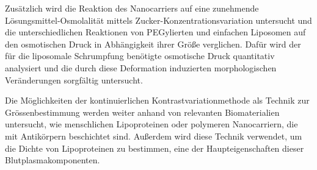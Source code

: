 

Zusätzlich wird die Reaktion des Nanocarriers auf eine zunehmende Lösungsmittel-Osmolalität mittels Zucker-Konzentrationsvariation untersucht und die unterschiedlichen Reaktionen von PEGylierten und einfachen Liposomen auf den osmotischen Druck in Abhängigkeit ihrer Größe verglichen. Dafür wird der für die liposomale Schrumpfung benötigte osmotische Druck quantitativ analysiert und die durch diese Deformation induzierten morphologischen Veränderungen sorgfältig untersucht.




Die Möglichkeiten der kontinuierlichen Kontrastvariationmethode als Technik zur Grössenbestimmung werden weiter anhand von relevanten Biomaterialien untersucht, wie menschlichen Lipoproteinen oder polymeren Nanocarriern, die mit Antikörpern beschichtet sind. Außerdem wird diese Technik verwendet, um die Dichte von Lipoproteinen zu bestimmen, eine der Haupteigenschaften dieser Blutplasmakomponenten.









\cleardoublepage
